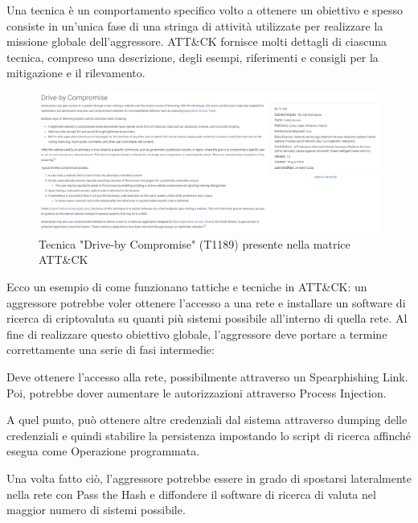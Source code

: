 Una tecnica è un comportamento specifico volto a ottenere un obiettivo e spesso consiste in un'unica fase di una stringa di attività utilizzate per realizzare la missione globale dell'aggressore. ATT\&CK fornisce molti dettagli di ciascuna tecnica, compreso una descrizione, degli esempi, riferimenti e consigli per la mitigazione e il rilevamento.


\begin{figure}[h]
\begin{center}
\includegraphics[width=0.95\columnwidth]{images/2_architettura_img/tecnicaATT&CK.png}
\end{center}
\caption{Tecnica "Drive-by Compromise" (T1189) presente nella matrice ATT\&CK }
\label{fig:Tecnica "Drive-by Compromise" (T1189) presente nella matrice ATTCK }
\end{figure}

\newpage

Ecco un esempio di come funzionano tattiche e tecniche in ATT\&CK: un aggressore potrebbe voler ottenere l'accesso a una rete e installare un software di ricerca di criptovaluta su quanti più sistemi possibile all'interno di quella rete. 
Al fine di realizzare questo obiettivo globale, l'aggressore deve portare a termine correttamente una serie di fasi intermedie:\par
Deve ottenere l'accesso alla rete, possibilmente attraverso un Spearphishing Link. Poi, potrebbe dover aumentare le autorizzazioni attraverso Process Injection.\par
A quel punto, può ottenere altre credenziali dal sistema attraverso dumping delle credenziali e quindi stabilire la persistenza impostando lo script di ricerca affinché esegua come Operazione programmata.\par
Una volta fatto ciò, l'aggressore potrebbe essere in grado di spostarsi lateralmente nella rete con Pass the Hash e diffondere il software di ricerca di valuta nel maggior numero di sistemi possibile.\par

